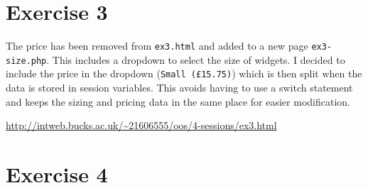 \captionsetup{type=figure}


\section{Exercise 3}

The price has been removed from \texttt{ex3.html} and added to a new page \texttt{ex3-size.php}. This includes a dropdown to select the size of widgets. I decided to include the price in the dropdown (\texttt{Small (£15.75)}) which is then split when the data is stored in session variables. This avoids having to use a switch statement and keeps the sizing and pricing data in the same place for easier modification.

\url{http://intweb.bucks.ac.uk/~21606555/oos/4-sessions/ex3.html}

\captionsetup{type=figure}


\captionsetup{type=figure}


\captionsetup{type=figure}


\captionsetup{type=figure}


\section{Exercise 4}
